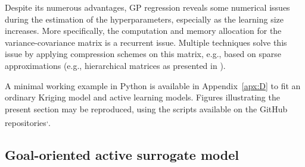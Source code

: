 Despite its numerous advantages, GP regression reveals some numerical issues during the estimation of the hyperparameters, especially as the learning size increases. 
More specifically, the computation and memory allocation for the variance-covariance matrix is a recurrent issue. 
Multiple techniques solve this issue by applying compression schemes on this matrix, e.g., based on sparse approximations (e.g., hierarchical matrices as presented in \citealp{geoga_2020_hmat_gp}). 



\begin{otexample}
    A minimal working example in Python is available in Appendix~\ref{apx:D} to fit an ordinary Kriging model and active learning models. 
    Figures illustrating the present section may be reproduced, using the \ots scripts available on the GitHub repositories\footnotemark[13]\textsuperscript{,}\footnotemark[14].  
\end{otexample}



\subsection{Goal-oriented active surrogate model}\label{sec:active_surrogates}

